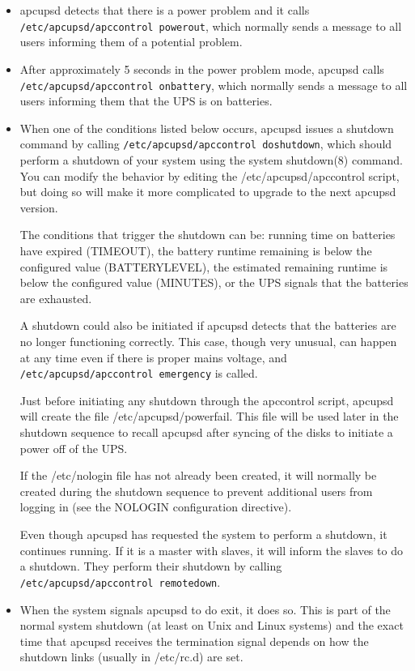 {{{{{{{{{{{{{{{\begin{itemize}
\item apcupsd detects that there is a power problem and it calls {\tt
/etc/apcupsd/apccontrol powerout}, which normally sends a message to all users
informing them of a potential problem.  
\item After approximately 5 seconds in the power problem mode, apcupsd calls
{\tt /etc/apcupsd/apccontrol onbattery}, which normally sends a message to all
users informing them that the UPS is on batteries.  
\item When one of the conditions listed below occurs, apcupsd issues a
shutdown command by calling {\tt /etc/apcupsd/apccontrol doshutdown}, which
should perform a shutdown of your system using the system shutdown(8) command.
You can modify the behavior by editing the /etc/apcupsd/apccontrol script, but
doing so will make it more complicated to upgrade to the next apcupsd version.
 

The conditions that trigger the shutdown can be: running time on batteries
have expired (TIMEOUT), the battery runtime remaining is below the configured
value (BATTERYLEVEL), the estimated remaining runtime is below the configured
value (MINUTES), or the UPS signals that the batteries are exhausted.  

A shutdown could also be initiated if apcupsd detects that the batteries are
no longer functioning correctly. This case, though very unusual, can happen at
any time even if there is proper mains voltage, and {\tt
/etc/apcupsd/apccontrol emergency} is called.  

Just before initiating any shutdown through the apccontrol script, apcupsd
will create the file /etc/apcupsd/powerfail. This file will be used later in
the shutdown sequence to recall apcupsd after syncing of the disks to initiate
a power off of the UPS.  

If the /etc/nologin file has not already been created, it will normally be
created during the shutdown sequence to prevent additional users from logging
in (see the NOLOGIN configuration directive).  

Even though apcupsd has requested the system to perform a shutdown, it
continues running. If it is a master with slaves, it will inform the slaves to
do a shutdown. They perform their shutdown by calling {\tt
/etc/apcupsd/apccontrol remotedown}.  
\item When the system signals apcupsd to do exit, it does so.  This is part of
the normal system shutdown (at least on Unix and Linux systems) and the exact
time that apcupsd receives the termination signal depends on how the shutdown
links (usually in /etc/rc.d) are set.  


\end{itemize}}}}}}}}}}}}}}}}

